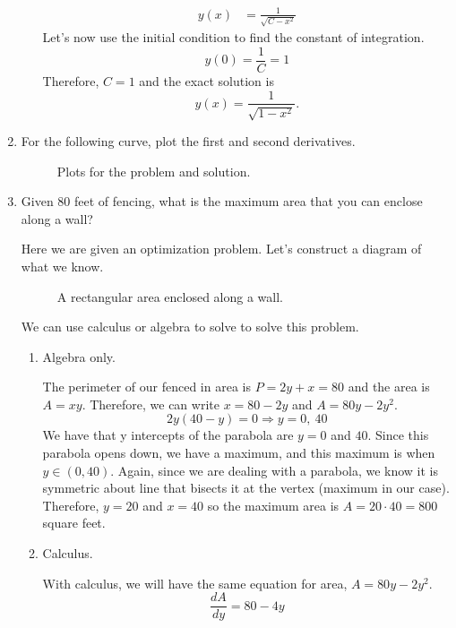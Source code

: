 \begin{enumerate}
\begin{enumerate}[label = (\alph*)]
\begin{align*}
      y(x) &= \frac{1}{\sqrt{C - x^2}}
    \end{align*}
    Let's now use the initial condition to find the constant of integration.
    \[
    y(0) = \frac{1}{C} = 1
    \]
    Therefore, \(C = 1\) and the exact solution is
    \[
    y(x) = \frac{1}{\sqrt{1 - x^2}}.
    \]
  \end{enumerate}
\item
  For the following curve, plot the first and second derivatives.
  \begin{figure}[H]
    \centering
    \quad
    \caption{Plots for the problem and solution.}
  \end{figure}
\item
  Given \(80\) feet of fencing, what is the maximum area that you can enclose
  along a wall?
  \par\smallskip
  Here we are given an optimization problem.
  Let's construct a diagram of what we know.
  \begin{figure}[H]
    \centering
    
    \caption{A rectangular area enclosed along a wall.}
    \label{NUPOCmath33}
  \end{figure}
  We can use calculus or algebra to solve to solve this problem.
  \begin{enumerate}[label = {Case \arabic*:}]
  \item
    Algebra only.
    \par\smallskip
    The perimeter of our fenced in area is \(P = 2y + x = 80\) and the area
    is \(A = xy\).
    Therefore, we can write \(x = 80 - 2y\) and \(A = 80y - 2y^2\).
    \[
    2y(40 - y) = 0\Rightarrow y = 0, \ 40
    \]
    We have that y intercepts of the parabola are \(y = 0\) and \(40\).
    Since this parabola opens down, we have a maximum, and this maximum is
    when \(y\in(0, 40)\).
    Again, since we are dealing with a parabola, we know it is symmetric about
    line that bisects it at the vertex (maximum in our case).
    Therefore, \(y = 20\) and \(x = 40\) so the maximum area is
    \(A = 20\cdot 40 = 800\) square feet.
  \item
    Calculus.
    \par\smallskip
    With calculus, we will have the same equation for area, \(A = 80y - 2y^2\).
    \[
    \frac{dA}{dy} = 80 - 4y
\]
\end{enumerate}
\end{enumerate}
